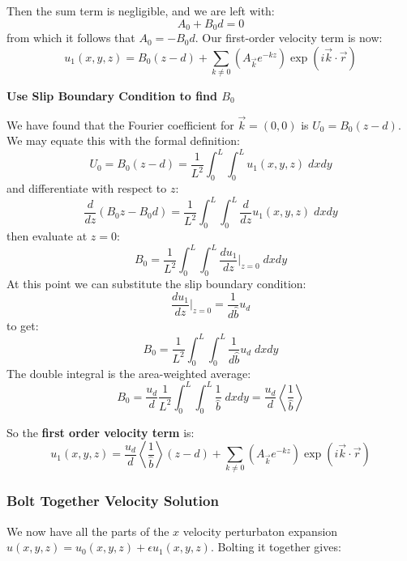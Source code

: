 \documentclass[a4paper]{report}
\begin{document}
Then the sum term is negligible, and we are left with:
\begin{equation}
A_0 + B_0 d = 0
\end{equation}
from which it follows that $A_0 = - B_0 d $.  Our first-order velocity term is now:
\begin{equation}
u_1(x,y,z) =  B_0 (z - d) + \sum_{k \neq 0} 
\left(  A_{\vec{k}} e^{-kz} \right)
\exp(i \vec{k}\cdot \vec{r})
\end{equation}

\textbf{Use Slip Boundary Condition to find $B_0$}

We have found that the Fourier coefficient for $\vec{k} = (0,0)$ is $U_0 = B_0 (z - d)$.
We may equate this with the formal definition:
\begin{equation}
U_0 = B_0 (z - d) = \frac{1}{L^2} \int_0^L \int_0^L u_1(x,y,z) \;dxdy
\end{equation}
and differentiate with respect to $z$:
\begin{equation}
\frac{d}{dz} ( B_0 z - B_0 d) = \frac{1}{L^2} \int_0^L \int_0^L \frac{d}{dz} u_1(x,y,z) \;dxdy
\end{equation}
then evaluate at $z=0$:
\begin{equation}
B_0 = \frac{1}{L^2} \int_0^L \int_0^L \frac{d u_1}{dz} \rvert_{z=0} \;dxdy
\end{equation}
At this point we can substitute the slip boundary condition:
\begin{equation}
\frac{d u_1}{d z} \rvert_{z=0} = \frac{1}{d \hat{b}} u_d
\end{equation}
to get:
\begin{equation}
B_0 = \frac{1}{L^2} \int_0^L \int_0^L \frac{1}{d \hat{b}} u_d \;dxdy
\end{equation}
The double integral is the area-weighted average:
\begin{equation}
B_0 = \frac{u_d}{d} \frac{1}{L^2} \int_0^L \int_0^L \frac{1}{\hat{b}} \;dxdy
= \frac{u_d}{d} \left< \frac{1}{\hat{b}} \right>
\end{equation}

\vspace{1em}
So the \textbf{first order velocity term} is:
\begin{equation}
u_1(x,y,z) =  \frac{u_d}{d} \left< \frac{1}{\hat{b}} \right> (z - d)
 + \sum_{k \neq 0} 
\left(  A_{\vec{k}} e^{-kz} \right)
\exp(i \vec{k}\cdot \vec{r})
\end{equation}


\subsubsection*{Bolt Together Velocity Solution}
We now have all the parts of the $x$ velocity perturbaton expansion $u(x,y,z) = u_0(x,y,z) + \epsilon u_1(x,y,z)$.  Bolting it together gives:
\end{document}
